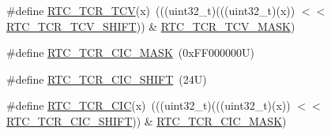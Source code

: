 \begin{DoxyCompactItemize}
\#define \mbox{\hyperlink{group___r_t_c___register___masks_gaa8994c74539b06641e723be00af76459}{R\+T\+C\+\_\+\+T\+C\+R\+\_\+\+T\+CV}}(x)~(((uint32\+\_\+t)(((uint32\+\_\+t)(x)) $<$$<$ \mbox{\hyperlink{group___r_t_c___register___masks_ga6bcbafe57cdb430da5ee6902e0bcb224}{R\+T\+C\+\_\+\+T\+C\+R\+\_\+\+T\+C\+V\+\_\+\+S\+H\+I\+FT}})) \& \mbox{\hyperlink{group___r_t_c___register___masks_ga920f92da02ac0a6ae0931645600e2405}{R\+T\+C\+\_\+\+T\+C\+R\+\_\+\+T\+C\+V\+\_\+\+M\+A\+SK}})
\item 
\#define \mbox{\hyperlink{group___r_t_c___register___masks_ga788e49f72c48b3c98794b49e27337c64}{R\+T\+C\+\_\+\+T\+C\+R\+\_\+\+C\+I\+C\+\_\+\+M\+A\+SK}}~(0x\+F\+F000000\+U)
\item 
\#define \mbox{\hyperlink{group___r_t_c___register___masks_ga84c801695fa1e344e7b2c8e6568cb7c8}{R\+T\+C\+\_\+\+T\+C\+R\+\_\+\+C\+I\+C\+\_\+\+S\+H\+I\+FT}}~(24\+U)
\item 
\#define \mbox{\hyperlink{group___r_t_c___register___masks_ga650d1b34ad6d46090befda0296b4fe3f}{R\+T\+C\+\_\+\+T\+C\+R\+\_\+\+C\+IC}}(x)~(((uint32\+\_\+t)(((uint32\+\_\+t)(x)) $<$$<$ \mbox{\hyperlink{group___r_t_c___register___masks_ga84c801695fa1e344e7b2c8e6568cb7c8}{R\+T\+C\+\_\+\+T\+C\+R\+\_\+\+C\+I\+C\+\_\+\+S\+H\+I\+FT}})) \& \mbox{\hyperlink{group___r_t_c___register___masks_ga788e49f72c48b3c98794b49e27337c64}{R\+T\+C\+\_\+\+T\+C\+R\+\_\+\+C\+I\+C\+\_\+\+M\+A\+SK}})
\end{DoxyCompactItemize}

